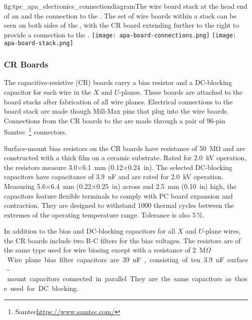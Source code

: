 \begin{dunefigure}{fig:tpc_apa_electronics_connectiondiagram}{The wire board stack at the head end of an  and the connection to the . The set of wire boards within a stack can be seen on both sides of the , with the CR board extending further to the right to provide a connection to the .}
\texttt{[image: apa-board-connections.png]}
\texttt{[image: apa-board-stack.png]}

\end{dunefigure} 


\subsubsection{CR Boards}
\label{sec:crboards}

The capacitive-resistive (CR) boards carry a bias resistor and a DC-blocking capacitor for each wire in the $X$ and $U$-planes. These boards are attached to the board stacks after fabrication of all wire planes.   Electrical connections to the board stack are made though Mill-Max pins that plug into the wire boards. Connections from the CR boards to the  are made through a pair of \num{96}-pin Samtec~\footnote{Samtec\texttrademark \url{https://www.samtec.com/}} connectors.

Surface-mount bias resistors on the CR boards have resistance of \SI{50}{\mega\ohm} and are constructed with a thick film on a ceramic substrate. Rated for \SI{2.0}{kV} operation, the resistors measure \num{3.0}$\times$\SI{6.1}{mm} (\num{0.12}$\times$\SI{0.24}{in}). The selected DC-blocking capacitors have capacitance of \SI{3.9}{nF} and are rated for \SI{2.0}{kV} operation. Measuring \num{5.6}$\times$\SI{6.4}{mm} (\num{0.22}$\times$\SI{0.25}{in}) across and \SI{2.5}{mm} (\SI{0.10}{in}) high, the capacitors feature flexible terminals to comply with PC board expansion and contraction. They are designed to withstand \num{1000} thermal cycles between the extremes of the operating temperature range. Tolerance is also \num{5}\,\%.

In addition to the bias and DC-blocking capacitors for all $X$ and $U$-plane wires, the CR boards include two R-C filters for the bias voltages. The resistors are of the same type used for wire biasing except with a resistance of \SI{2}{M$\Omega$}. Wire plane bias filter capacitors are \SI{39}{nF}, consisting of ten \SI{3.9}{nF} surface-mount capacitors connected in parallel. They are the same capacitors as those used for DC blocking.

